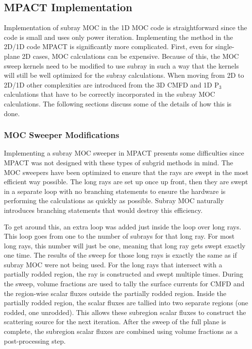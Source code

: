\subsection{MPACT Implementation}

Implementation of subray MOC in the 1D MOC code is straightforward since the code is small and uses only power iteration.  Implementing the method in the 2D/1D code MPACT is significantly more complicated.  First, even for single-plane 2D cases, MOC calculations can be expensive.  Because of this, the MOC sweep kernels need to be modified to use subray in such a way that the kernels will still be well optimized for the subray calculations.  When moving from 2D to 2D/1D other complexities are introduced from the 3D CMFD and 1D P$_3$ calculations that have to be correctly incorporated in the subray MOC calculations.  The following sections discuss some of the details of how this is done.

\subsubsection{MOC Sweeper Modifications}

Implementing a subray MOC sweeper in MPACT presents some difficulties since MPACT was not designed with these types of subgrid methods in mind.  The MOC sweepers have been optimized to ensure that the rays are swept in the most efficient way possible.  The long rays are set up once up front, then they are swept in a separate loop with no branching statements to ensure the hardware is performing the calculations as quickly as possible.  Subray MOC naturally introduces branching statements that would destroy this efficiency.

To get around this, an extra loop was added just inside the loop over long rays.  This loop goes from one to the number of subrays for that long ray.  For most long rays, this number will just be one, meaning that long ray gets swept exactly one time.  The results of the sweep for those long rays is exactly the same as if subray MOC were not being used.  For the long rays that intersect with a partially rodded region, the ray is constructed and swept multiple times.  During the sweep, volume fractions are used to tally the surface currents for CMFD and the region-wise scalar fluxes outside the partially rodded region.  Inside the partially rodded region, the scalar fluxes are tallied into two separate regions (one rodded, one unrodded).  This allows these subregion scalar fluxes to construct the scattering source for the next iteration.  After the sweep of the full plane is complete, the subregion scalar fluxes are combined using volume fractions as a post-processing step.

